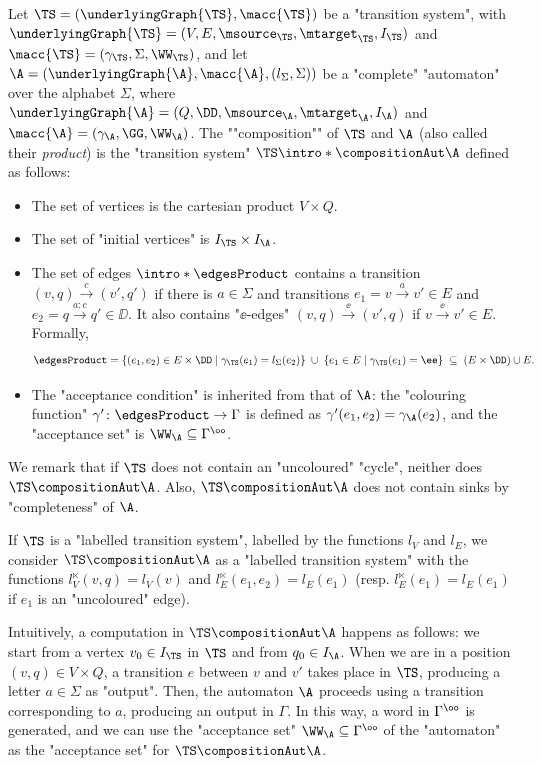 \documentclass[10pt,a4paper]{amsart}
\renewcommand{\gg}{\gamma}
\renewcommand{\SS}{\Sigma}
\newcommand{\re}[1]{\xrightarrow{#1}}
\begin{document}
Let $\TS =(\underlyingGraph{\TS}, \macc{\TS})$ be a "transition system", with $\underlyingGraph{\TS} = (V, E, \msource_\TS, \mtarget_\TS, I_{\TS})$ and $\macc{\TS} = (\gg_{\TS}, \SS, \WW_{\TS})$, %
and let $\A=\left(\underlyingGraph{\A}, \macc{\A}, (l_\SS, \SS)\right)$ be a "complete" "automaton" over the alphabet $\Sigma$, where $\underlyingGraph{\A} = (Q,  \DD, \msource_\A, \mtarget_\A, I_{\A})$ and $\macc{\A} = (\gg_{\A}, \GG, \WW_{\A})$. 
\AP The ""composition"" of $\TS$ and $\A$ (also called their \emph{product}) is the "transition system" $\TS \intro*\compositionAut \A$ defined as follows:
\begin{itemize}
	\item The set of vertices is the cartesian product $V\times Q$.
	\item The set of "initial vertices" is $I_{\TS} \times I_{\A}$.
	\item The set of edges $\intro*\edgesProduct$ contains a transition $(v,q)\re{c} (v', q')$ if there is $a\in \SS$ and transitions $e_1 = v\re{a} v'\in E$  and $e_2 = q\re{a:c} q'\in \DD$. It also contains "$\ee$-edges" $(v,q)\re{\ee} (v', q)$ if $v\re{\ee}v'\in E$. Formally, 
	\[ \edgesProduct = \{(e_1,e_2) \in E\times \DD \mid \gg_{\TS}(e_1) = l_\SS(e_2)\} \; \cup \; \{e_1 \in E \mid \gg_{\TS}(e_1) = \ee \} \; \subseteq \; (E \times \DD) \cup E. \]
	\item The "acceptance condition" is inherited from that of $\A$: the "colouring function" $\gamma'\colon \edgesProduct \to \Gamma$ is defined as $\gamma'(e_1,e_2)= \gamma_{\A}(e_2)$, and the "acceptance set" is $\WW_\A \subseteq \Gamma^\oo$.
\end{itemize}

We remark that if $\TS$ does not contain an "uncoloured" "cycle", neither does $\TS \compositionAut \A$. Also, $\TS \compositionAut \A$ does not contain sinks by "completeness" of $\A$.

If $\TS$ is a "labelled transition system", labelled by the functions $l_V$ and $l_E$, we consider $\TS \compositionAut \A$ as a "labelled transition system" with the functions $l_V^\ltimes(v,q) = l_V(v)$ and $l^\ltimes_E(e_1, e_2) = l_E(e_1)$ (resp. $l^\ltimes_E(e_1) = l_E(e_1)$ if $e_1$ is an "uncoloured" edge). 


Intuitively, a computation in $\TS \compositionAut \A$ happens as follows: we start from a vertex $v_0\in I_{\TS}$ in $\TS$ and from $q_0 \in I_{\A}$. When we are in a position $(v, q)\in V \times Q$, a transition $e$ between $v$ and $v'$ takes place in $\TS$, producing a letter $a\in \Sigma$ as "output". Then, the automaton $\A$ proceeds using a transition corresponding to $a$, producing an output in $\Gamma$. In this way, a word in $\Gamma^\oo$ is generated, and we can use the "acceptance set" $\WW_\A \subseteq \Gamma^\oo$ of the "automaton" as the "acceptance set" for $\TS \compositionAut \A$.
\end{document}
